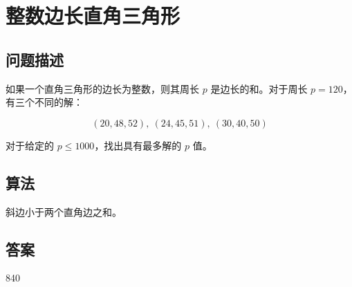 \section{整数边长直角三角形}\label{sec:problem39}
\subsection{问题描述}
\begin{tcolorbox}

	如果一个直角三角形的边长为整数，则其周长 \( p \) 是边长的和。对于周长 \( p = 120 \)，有三个不同的解：

	\[
		(20, 48, 52),\ (24, 45, 51),\ (30, 40, 50)
	\]

	对于给定的 \( p \leq 1000 \)，找出具有最多解的 \( p \) 值。
\end{tcolorbox}

\subsection{算法}
斜边小于两个直角边之和。

\subsection{答案}
840
